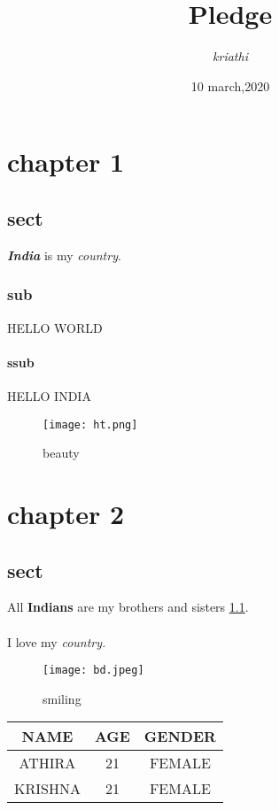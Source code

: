 \documentclass[12pt]{report}
\begin{document}
	\title{\textbf{Pledge}}
	\author{\textit{kriathi}}
	\date{10 march,2020 }
	\maketitle
	\chapter{chapter 1}
	\section{sect}
	\textit{\textbf{India}} is my \textit{country}.
	\subsection{sub}
	HELLO WORLD
	\subsubsection{ssub}
	HELLO INDIA
	\begin{figure}[H]
		\centering
	\texttt{[image: ht.png]}
	\caption{beauty}
	\label{f:l1}
	\end{figure}
	\chapter{chapter 2}
	\section{sect}
	All \textbf{Indians} are my brothers and sisters \ref{f:l1}.\\ \\I love my \textit{\textit{country}.}
	\begin{figure}[H]
		\centering
		\texttt{[image: bd.jpeg]}
		\caption{smiling}
	\end{figure}
\begin{center}
	\begin{tabular}{|c|c|c|}
		\hline
		NAME & AGE & GENDER \\
		\hline
		ATHIRA & 21 & FEMALE \\
		\hline
		KRISHNA & 21 & FEMALE\\
		\hline	
	\end{tabular}
\end{center}
\end{document}
